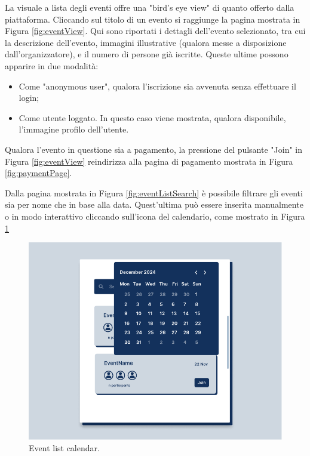 \documentclass[9pt]{extarticle}
\begin{document}
La visuale a lista degli eventi offre una "bird's eye view" di quanto offerto dalla piattaforma. Cliccando sul titolo di un evento si raggiunge la pagina mostrata in Figura \ref{fig:eventView}. Qui sono riportati i dettagli dell'evento selezionato, tra cui la descrizione dell'evento, immagini illustrative (qualora messe a disposizione dall'organizzatore), e il numero di persone già iscritte. Queste ultime possono apparire in due modalità:
\begin{itemize}
	\item Come "anonymous user", qualora l'iscrizione sia avvenuta senza effettuare il login;
	\item Come utente loggato. In questo caso viene mostrata, qualora disponibile, l'immagine profilo dell'utente.
\end{itemize}
\newpage
Qualora l'evento in questione sia a pagamento, la pressione del pulsante "Join" in Figura \ref{fig:eventView} reindirizza alla pagina di pagamento mostrata in Figura \ref{fig:paymentPage}.


Dalla pagina mostrata in Figura \ref{fig:eventListSearch} è possibile filtrare gli eventi sia per nome che in base alla data. Quest'ultima può essere inserita manualmente o in modo interattivo cliccando sull'icona del calendario, come mostrato in Figura \ref{fig:eventListSearchCalendar}

\begin{figure}[!htb]
	\centering
	\includegraphics[width=.7\linewidth]{./images/eventListSearchCalendar.pdf}
	\caption{Event list calendar.}
	\label{fig:eventListSearchCalendar}
\end{figure}
\newpage
\end{document}
